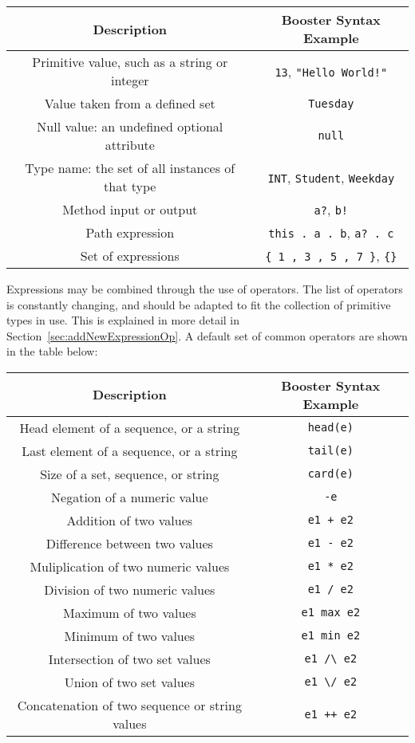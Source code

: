 \begin{center}
  \begin{tabular} { | c | c | } 
  \hline
  \textbf{Description} & \textbf{Booster Syntax Example} \\ \hline
  Primitive value, such as a string or integer & \verb|13|,
  \verb|"Hello World!"| \\ \hline
  Value taken from a defined set & \verb|Tuesday| \\ \hline
  Null value: an undefined optional attribute & \verb|null| \\ \hline
  Type name: the set of all instances of that type & \verb|INT|, \verb|Student|, \verb|Weekday| \\ \hline
  Method input or output & \verb|a?|, \verb|b!| \\ \hline
  Path expression & \verb|this . a . b|, \verb|a? . c| \\ \hline
  Set of expressions & \verb|{ 1 , 3 , 5 , 7 }|, \verb|{}| \\ \hline
  \end{tabular}
\end{center}

Expressions may be combined through the use of operators.  The list of
operators is constantly changing, and should be adapted to fit the
collection of primitive types in use.  This is explained in more
detail in Section~\ref{sec:addNewExpressionOp}. A default set of
common operators are shown in the table below:
\begin{center}
  \begin{tabular} { | c | c | } 
  \hline
  \textbf{Description} & \textbf{Booster Syntax Example} \\ \hline
  Head element of a sequence, or a string & \verb|head(e)| \\ \hline
  Last element of a sequence, or a string & \verb|tail(e)| \\ \hline
  Size of a set, sequence, or string & \verb|card(e)| \\ \hline
  Negation of a numeric value & \verb| -e | \\ \hline
  Addition of two values & \verb| e1 + e2 | \\ \hline
  Difference between two values & \verb| e1 - e2 | \\ \hline 
  Muliplication of two numeric values & \verb| e1 * e2 | \\ \hline 
  Division of two numeric values & \verb| e1 / e2 | \\ \hline 
  Maximum of two values & \verb| e1 max e2 | \\ \hline 
  Minimum of two values & \verb| e1 min e2 | \\ \hline 
  Intersection of two set values & \verb| e1 /\ e2 | \\ \hline 
  Union of two set values & \verb| e1 \/ e2 | \\ \hline 
  Concatenation of two sequence or string values & \verb| e1 ++ e2 | \\ \hline 
 \end{tabular}
\end{center}


